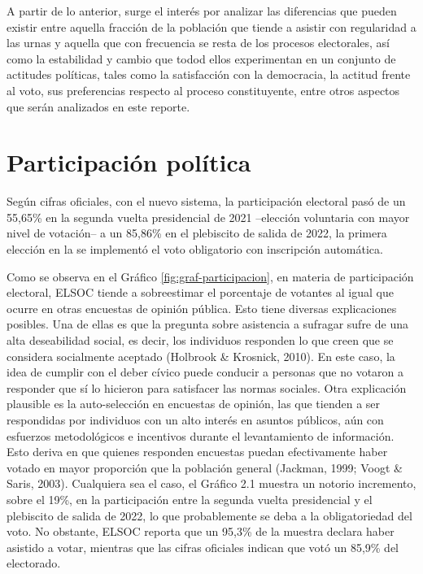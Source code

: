 \documentclass[
  12pt,
]{book}
\begin{document}
A partir de lo anterior, surge el interés por analizar las diferencias que pueden existir entre aquella fracción de la población que tiende a asistir con regularidad a las urnas y aquella que con frecuencia se resta de los procesos electorales, así como la estabilidad y cambio que todod ellos experimentan en un conjunto de actitudes políticas, tales como la satisfacción con la democracia, la actitud frente al voto, sus preferencias respecto al proceso constituyente, entre otros aspectos que serán analizados en este reporte.

\hypertarget{participaciuxf3n-poluxedtica}{%
\section{Participación política}\label{participaciuxf3n-poluxedtica}}

Según cifras oficiales, con el nuevo sistema, la participación electoral pasó de un 55,65\% en la segunda vuelta presidencial de 2021 --elección voluntaria con mayor nivel de votación-- a un 85,86\% en el plebiscito de salida de 2022, la primera elección en la se implementó el voto obligatorio con inscripción automática.

Como se observa en el Gráfico \ref{fig:graf-participacion}, en materia de participación electoral, ELSOC tiende a sobreestimar el porcentaje de votantes al igual que ocurre en otras encuestas de opinión pública. Esto tiene diversas explicaciones posibles. Una de ellas es que la pregunta sobre asistencia a sufragar sufre de una alta deseabilidad social, es decir, los individuos responden lo que creen que se considera socialmente aceptado (Holbrook \& Krosnick, 2010). En este caso, la idea de cumplir con el deber cívico puede conducir a personas que no votaron a responder que sí lo hicieron para satisfacer las normas sociales. Otra explicación plausible es la auto-selección en encuestas de opinión, las que tienden a ser respondidas por individuos con un alto interés en asuntos públicos, aún con esfuerzos metodológicos e incentivos durante el levantamiento de información. Esto deriva en que quienes responden encuestas puedan efectivamente haber votado en mayor proporción que la población general (Jackman, 1999; Voogt \& Saris, 2003). Cualquiera sea el caso, el Gráfico 2.1 muestra un notorio incremento, sobre el 19\%, en la participación entre la segunda vuelta presidencial y el plebiscito de salida de 2022, lo que probablemente se deba a la obligatoriedad del voto. No obstante, ELSOC reporta que un 95,3\% de la muestra declara haber asistido a votar, mientras que las cifras oficiales indican que votó un 85,9\% del electorado.
\end{document}
